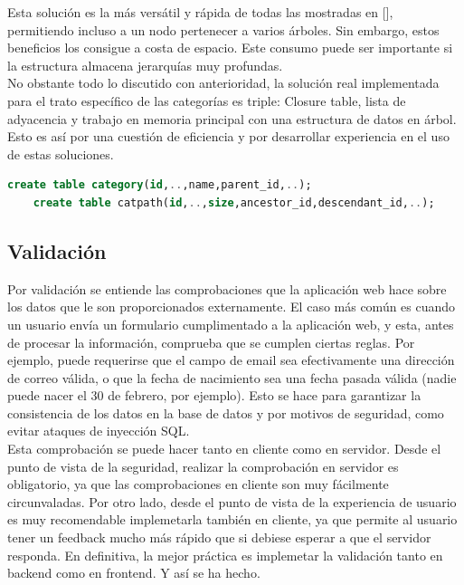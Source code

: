 \documentclass[a4paper]{report}
\begin{document}
    Esta solución es la más versátil y rápida de todas las mostradas en [], permitiendo incluso a un nodo pertenecer a varios árboles. Sin embargo, estos beneficios los consigue a costa de espacio. Este consumo puede ser importante si la estructura almacena jerarquías muy profundas.
    \\
    
    No obstante todo lo discutido con anterioridad, la solución real implementada para el trato específico de las categorías es triple: Closure table, lista de adyacencia y trabajo en memoria principal con una estructura de datos en árbol. Esto es así por una cuestión de eficiencia y por desarrollar experiencia en el uso de estas soluciones.
    \\
    
    \begin{lstlisting}[language=SQL, caption=Tablas que gestionan las categorías]
    create table category(id,..,name,parent_id,..);
    create table catpath(id,..,size,ancestor_id,descendant_id,..);
    \end{lstlisting}
    
    \subsection{Validación}
    Por validación se entiende las comprobaciones que la aplicación web hace sobre los datos que le son proporcionados externamente. El caso más común es cuando un usuario envía un formulario cumplimentado a la aplicación web, y esta, antes de procesar la información, comprueba que se cumplen ciertas reglas. Por ejemplo, puede requerirse que el campo de email sea efectivamente una dirección de correo válida, o que la fecha de nacimiento sea una fecha pasada válida (nadie puede nacer el 30 de febrero, por ejemplo). Esto se hace para garantizar la consistencia de los datos en la base de datos y por motivos de seguridad, como evitar ataques de inyección SQL.
    \\
    
    Esta comprobación se puede hacer tanto en cliente como en servidor. Desde el punto de vista de la seguridad, realizar la comprobación en servidor es obligatorio, ya que las comprobaciones en cliente son muy fácilmente circunvaladas. Por otro lado, desde el punto de vista de la experiencia de usuario es muy recomendable implemetarla también en cliente, ya que permite al usuario tener un feedback mucho más rápido que si debiese esperar a que el servidor responda. En definitiva, la mejor práctica es implemetar la validación tanto en backend como en frontend. Y así se ha hecho.
    \\
    
\end{document}
